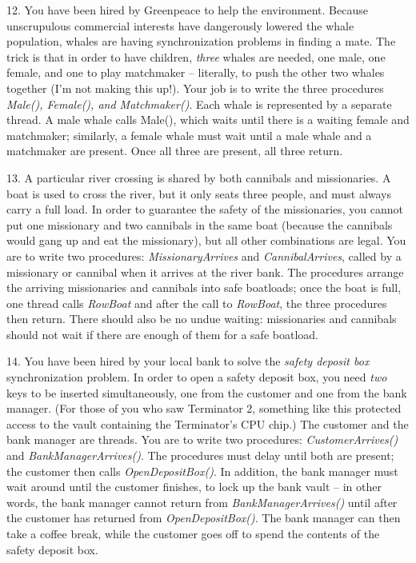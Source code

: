 \begin{description}
\item{12.} You have been hired by Greenpeace to help the environment.
Because unscrupulous commercial interests have dangerously lowered
the whale population, whales are having synchronization problems
in finding a mate.  The trick is that in order to have children,
{\em three} whales are needed, one male, one female, and one to
play matchmaker -- literally, to push the other two whales together
(I'm not making this up!).
Your job is to write the three procedures {\em Male(), Female(), and
Matchmaker()}.  Each whale is represented by a separate thread.
A male whale calls Male(), which waits until there is a waiting female
and matchmaker; similarly, a female whale must wait until a male whale
and a matchmaker are present.  Once all three are present, all three return.

\item{13.}
A particular river crossing is shared by both
cannibals and missionaries.  A boat is used to cross the river, but
it only seats three people, and must always carry a full load.  In
order to guarantee the safety of the missionaries, you cannot put
one missionary and two cannibals in the same boat (because the cannibals would
gang up and eat the missionary), but all other combinations are legal.
You are to write two procedures: {\em MissionaryArrives} and
{\em CannibalArrives},
called by a missionary or cannibal when it arrives at the river bank.
The procedures arrange the arriving missionaries and cannibals into
safe boatloads; once the boat is full, one thread calls {\em RowBoat}
and after the call to {\em RowBoat}, the three procedures then return.
There should also be no undue waiting:
missionaries and cannibals should not wait if there are enough of them
for a safe boatload.

\item{14.}
You have been hired by your local bank to solve the {\em safety deposit box}
synchronization problem.  In order to open a safety deposit box,
you need {\em two} keys to be inserted simultaneously, one from
the customer and one from the bank manager.  (For those of you who
saw Terminator 2, something like this protected access to the
vault containing the Terminator's CPU chip.)  The customer and the
bank manager are threads.   You are to write two procedures:
{\em CustomerArrives()} and {\em BankManagerArrives()}.
The procedures must delay until both are present; the customer
then calls {\em OpenDepositBox()}.   In addition, the bank manager
must wait around until the customer finishes, to lock up the bank vault --
in other words, the bank manager cannot return from {\em BankManagerArrives()}
until after the customer has returned from {\em OpenDepositBox()}.
The bank manager can then take a coffee break, while the customer goes off to
spend the contents of the safety deposit box.

\end{description}


